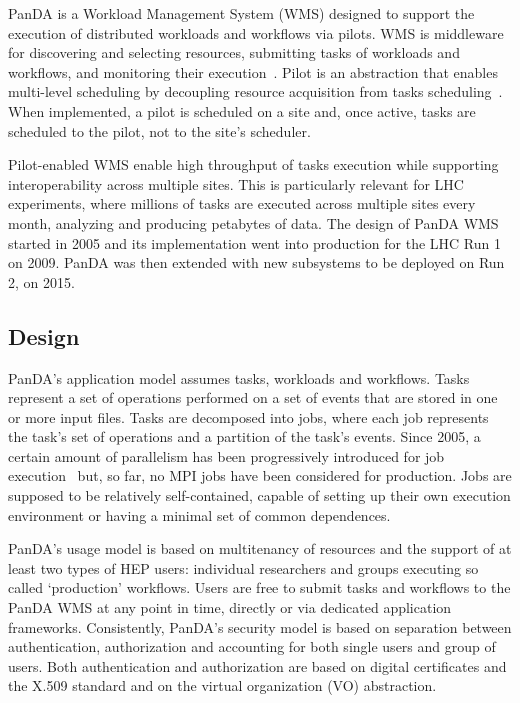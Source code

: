PanDA is a Workload Management System (WMS) designed to support the execution of
distributed workloads and workflows via pilots. WMS is middleware for
discovering and selecting resources, submitting tasks of workloads and
workflows, and monitoring their execution~\cite{marco2009glite}. Pilot is an
abstraction that enables multi-level scheduling by decoupling resource
acquisition from tasks scheduling~\cite{turilli2015comprehensive}. When
implemented, a pilot is scheduled on a site and, once active, tasks are
scheduled to the pilot, not to the site's scheduler.

Pilot-enabled WMS enable high throughput of tasks execution while supporting
interoperability across multiple sites. This is particularly relevant for LHC
experiments, where millions of tasks are executed across multiple sites every
month, analyzing and producing petabytes of data. The design of PanDA WMS
started in 2005 and its implementation went into production for the LHC Run 1 on
2009. PanDA was then extended with new subsystems to be deployed on Run 2, on
2015.



\subsection{Design}
\label{ssec:panda_design}

PanDA's application model assumes tasks, workloads and workflows. Tasks
represent a set of operations performed on a set of events that are stored in
one or more input files. Tasks are decomposed into jobs, where each job
represents the task's set of operations and a partition of the task's events.
Since 2005, a certain amount of parallelism has been progressively introduced
for job execution~\cite{crooks2012multi} but, so far, no MPI jobs have been
considered for production. Jobs are supposed to be relatively self-contained,
capable of setting up their own execution environment or having a minimal set of
common dependences.

PanDA's usage model is based on multitenancy of resources and the support of at
least two types of HEP users: individual researchers and groups executing so
called `production' workflows. Users are free to submit tasks and workflows to
the PanDA WMS at any point in time, directly or via dedicated application
frameworks. Consistently, PanDA's security model is based on separation between
authentication, authorization and accounting for both single users and group of
users. Both authentication and authorization are based on digital certificates
and the X.509 standard and on the virtual organization (VO) abstraction.

